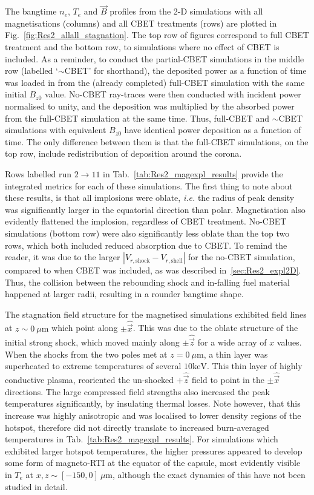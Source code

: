 The bangtime $n_e$, $T_e$ and $\vec{B}$ profiles from the 2-D simulations with all magnetisations (columns) and all \ac{CBET} treatments (rows) are plotted in Fig.~\ref{fig:Res2_allall_stagnation}.
The top row of figures correspond to full \ac{CBET} treatment and the bottom row, to simulations where no effect of \ac{CBET} is included.
As a reminder, to conduct the partial-\ac{CBET} simulations in the middle row (labelled `$\sim$\ac{CBET}' for shorthand), the deposited power as a function of time was loaded in from the (already completed) full-\ac{CBET} simulation with the same initial $B_{z0}$ value.
No-\ac{CBET} ray-traces were then conducted with incident power normalised to unity, and the deposition was multiplied by the absorbed power from the full-\ac{CBET} simulation at the same time.
Thus, full-\ac{CBET} and $\sim$\ac{CBET} simulations with equivalent $B_{z0}$ have identical power deposition as a function of time.
The only difference between them is that the full-\ac{CBET} simulations, on the top row, include redistribution of deposition around the corona.

Rows labelled run $2\rightarrow11$ in Tab.~\ref{tab:Res2_magexpl_results} provide the integrated metrics for each of these simulations.
The first thing to note about these results, is that all implosions were oblate, \textit{i.e.} the radius of peak density was significantly larger in the equatorial direction than polar.
Magnetisation also evidently flattened the implosion, regardless of \ac{CBET} treatment.
No-\ac{CBET} simulations (bottom row) were also significantly less oblate than the top two rows, which both included reduced absorption due to \ac{CBET}.
To remind the reader, it was due to the larger $|V_{r,\text{shock}} - V_{r,\text{shell}}|$ for the no-\ac{CBET} simulation, compared to when \ac{CBET} was included, as was described in~\ref{sec:Res2_expl2D}.
Thus, the collision between the rebounding shock and in-falling fuel material happened at larger radii, resulting in a rounder bangtime shape.

The stagnation field structure for the magnetised simulations exhibited field lines at $z\sim0\ \mu\text{m}$ which point along $\pm\hat{\vec{x}}$.
This was due to the oblate structure of the initial strong shock, which moved mainly along $\pm\hat{\vec{z}}$ for a wide array of $x$ values.
When the shocks from the two poles met at $z=0\ \mu\text{m}$, a thin layer was superheated to extreme temperatures of several $10 \text{keV}$.
This thin layer of highly conductive plasma, reoriented the un-shocked $+\hat{\vec{z}}$ field to point in the $\pm\hat{\vec{x}}$ directions.
The large compressed field strengths also increased the peak temperatures significantly, by insulating thermal losses.
Note however, that this increase was highly anisotropic and was localised to lower density regions of the hotspot, therefore did not directly translate to increased burn-averaged temperatures in Tab.~\ref{tab:Res2_magexpl_results}.
For simulations which exhibited larger hotspot temperatures, the higher pressures appeared to develop some form of magneto-\ac{RTI} at the equator of the capsule, most evidently visible in $T_e$ at $x,z\sim[-150,0]\ \mu\text{m}$, although the exact dynamics of this have not been studied in detail.


